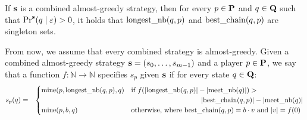 \documentclass[11pt]{article}
\newcommand{\lnb}{\text{\rm longest\_nb}}
\newcommand{\meetnb}{\text{\rm meet\_nb}}
\newcommand{\bc}{\text{\rm best\_chain}}
\begin{document}
%
\begin{myprop}
If $\bs$ is a combined almost-greedy strategy, then for every $p \in \mathbf{P}$ and $q \in \mathbf{Q}$ such that 
$\Pr^{\mathbf{s}}(q \mid \varepsilon) > 0$, it holds that $\lnb(q,p)$ and $\bc(q,p)$ are singleton sets.
\end{myprop}

\iffalse

\begin{myprop}
Let $\bs$ a combined greedy basic strategy, then for any $p$ and any $q$  such that $\Pr^{\bs}(q \mid \epsilon) \neq 0$ we have $|Longest_0(q,p)| = 1$ and $|Longest_p(q)| = 1$ and ... WIP
\end{myprop}
\begin{proof}
to do.
\end{proof}

\begin{myprop}
Let $\bs$ a combined greedy basic strategy and $\sigma$ a strategy for player $p$, then for any $q$ such that $\Pr^{(\bs_{\lnot p},\sigma)}(q \mid \epsilon) \neq 0$ we have $|Longest_1(q,p)| = 1$ and ... WIP
\end{myprop}
\begin{proof}
to do.
\end{proof}

\fi

From now, we assume that every combined strategy is almost-greedy. Given a combined almost-greedy strategy $\mathbf{s} = (s_0, \ldots, s_{m-1})$ and a player $p \in \mathbf{P}$, we say that a function $f : \mathbb{N} \to \mathbb{N}$ specifies $s_p$ given $\bs$ if for every state $q \in \mathbf{Q}$:
\begin{eqnarray*}
s_p(q) & = &
\begin{cases}
\mine(p,\lnb(q,p),q) & \text{if } f(|\lnb(q,p)|-|\meetnb(q)|) >\\
& \hspace{100pt}|\bc(q,p)|-|\meetnb(q)|\\
\mine(p,b,q) & \text{otherwise, where } \bc(q,p) = b \cdot v \text{ and } |v| = f(0)\\
\end{cases}
\end{eqnarray*}
\end{document}
